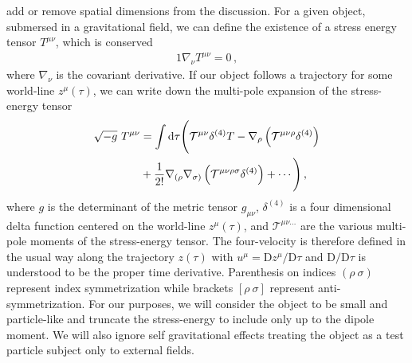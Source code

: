 add or remove spatial dimensions from the discussion. For a given object, submersed in a gravitational field, we can define the existence of a stress energy tensor $T^{\mu\nu}$, which is conserved
\begin{alignat}{1}
  \label{STRESS01} \nabla_{\nu}T^{\mu\nu}=0\,,
\end{alignat}
where $\nabla_{\nu}$ is the covariant derivative. If our object follows a trajectory for some world-line $z^{\mu}(\tau)$, we can write down the multi-pole expansion of the stress-energy tensor
\begin{alignat}{1}
  \notag \sqrt{-g}\ T^{\mu\nu}&=\int\mathrm{d}\tau\Bigg(\mathcal{T}^{\mu\nu}\delta^{(4)}T-\nabla_{\rho}\left(\mathcal{T}^{\mu\nu\rho}\delta^{(4)}\right)\\
  \label{STRESS02} &+\frac{1}{2!}\nabla_{(\rho}\nabla_{\sigma)}\left(\mathcal{T}^{\mu\nu\rho\sigma}\delta^{(4)}\right)+\cdots\Bigg)\,,
\end{alignat}
where $g$ is the determinant of the metric tensor $g_{\mu\nu}$, $\delta^{(4)}$ is a four dimensional delta function centered on the world-line $z^{\mu}(\tau)$, and $\mathcal{T}^{\mu\nu\ldots}$ are the various multi-pole moments of the stress-energy tensor. The four-velocity is therefore defined in the usual way along the trajectory $z(\tau)$ with $u^{\mu}=\mathrm{D}z^{\mu}/\mathrm{D}\tau$ and $\mathrm{D}/\mathrm{D}\tau$ is understood to be the proper time derivative. Parenthesis on indices $(\rho\ \sigma)$ represent index symmetrization while brackets $[\rho\ \sigma]$ represent anti-symmetrization. For our purposes, we will consider the object to be small and particle-like and truncate the stress-energy to include only up to the dipole moment. We will also ignore self gravitational effects treating the object as a test particle subject only to external fields.

